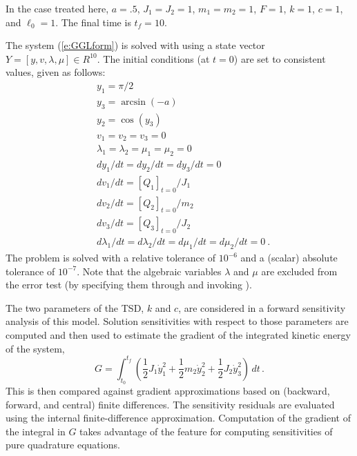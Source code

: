 In the case treated here, $a = .5$, $J_1 = J_2 = 1$, $m_1 = m_2 = 1$,
$F = 1$, $k = 1$, $c = 1$, and $\ell_0 = 1$. The final time is $t_f = 10$.

The system (\ref{e:GGLform}) is solved with {\idas} using a state vector
$Y = [y, v, \lambda, \mu] \in R^{10}$.   The initial conditions (at $t = 0$)
are set to consistent values, given as follows:
\begin{equation*}
  \begin{split}
    &y_1 = \pi/2 \\
    &y_3 = \arcsin(-a) \\
    &y_2 = \cos(y_3) \\
    &v_1 = v_2 = v_3 = 0 \\
    &\lambda_1 = \lambda_2 = \mu_1 = \mu_2 = 0 \\
    &dy_1/dt = dy_2/dt = dy_3/dt = 0 \\
    &dv_1/dt = \left[Q_1\right]_{t=0} / J_1 \\
    &dv_2/dt = \left[Q_2\right]_{t=0} / m_2 \\
    &dv_3/dt = \left[Q_3\right]_{t=0} / J_2 \\
    &d\lambda_1/dt = d\lambda_2/dt = d\mu_1/dt = d\mu_2/dt = 0 ~.
  \end{split}
\end{equation*}
The problem is solved with a relative tolerance of $10^{-6}$ and a (scalar) absolute
tolerance of $10^{-7}$. Note that the algebraic variables $\lambda$ and $\mu$ are
excluded from the error test (by specifying them through  and invoking
).

The two parameters of the TSD, $k$ and $c$, are considered in a forward
sensitivity analysis of this model. Solution sensitivities with respect
to those parameters are computed and then used to estimate the gradient
of the integrated kinetic energy of the system,
\begin{equation}
  G = \int_{t_0}^{t_f} \left(    
    \frac{1}{2} J_1 \dot y_1^2 + \frac{1}{2} m_2 \dot y_2^2 + \frac{1}{2} J_2 \dot y_3^2 \right) \, dt \, .
\end{equation}
This is then compared against gradient approximations based on (backward, forward, and central)
finite differences.  The sensitivity residuals are evaluated using the {\idas} internal
finite-difference approximation.  Computation of the gradient of the integral in $G$ takes
advantage of the {\idas} feature for computing sensitivities of pure quadrature equations.

